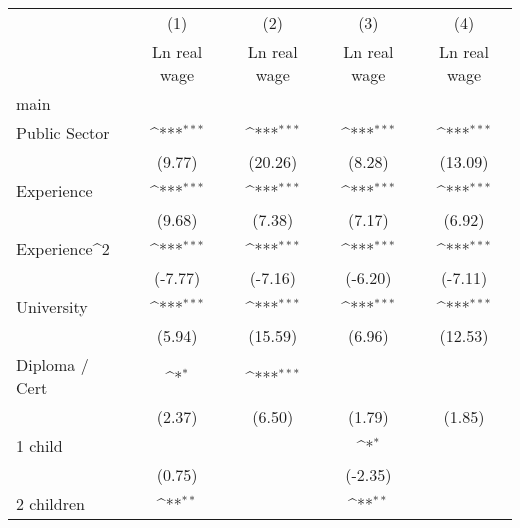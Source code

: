 {
\def\sym#1{\ifmmode^{#1}\else\(^{#1}\)\fi}
\begin{tabular}{l*{4}{c}}
\hline\hline
                    &\multicolumn{1}{c}{(1)}&\multicolumn{1}{c}{(2)}&\multicolumn{1}{c}{(3)}&\multicolumn{1}{c}{(4)}\\
                    &\multicolumn{1}{c}{Ln real wage}&\multicolumn{1}{c}{Ln real wage}&\multicolumn{1}{c}{Ln real wage}&\multicolumn{1}{c}{Ln real wage}\\
\hline
main                &                     &                     &                     &                     \\
Public Sector       &            \sym{***}&            \sym{***}&            \sym{***}&            \sym{***}\\
                    &      (9.77)         &     (20.26)         &      (8.28)         &     (13.09)         \\
[1em]
Experience          &            \sym{***}&            \sym{***}&            \sym{***}&            \sym{***}\\
                    &      (9.68)         &      (7.38)         &      (7.17)         &      (6.92)         \\
[1em]
Experience^{2}      &            \sym{***}&            \sym{***}&            \sym{***}&            \sym{***}\\
                    &     (-7.77)         &     (-7.16)         &     (-6.20)         &     (-7.11)         \\
[1em]
University          &            \sym{***}&            \sym{***}&            \sym{***}&            \sym{***}\\
                    &      (5.94)         &     (15.59)         &      (6.96)         &     (12.53)         \\
[1em]
Diploma / Cert      &            \sym{*}  &            \sym{***}&                     &                     \\
                    &      (2.37)         &      (6.50)         &      (1.79)         &      (1.85)         \\
[1em]
1 child             &                     &                     &            \sym{*}  &                     \\
                    &      (0.75)         &                     &     (-2.35)         &                     \\
[1em]
2 children          &            \sym{**} &                     &            \sym{**} &                     \\

\end{tabular}}
